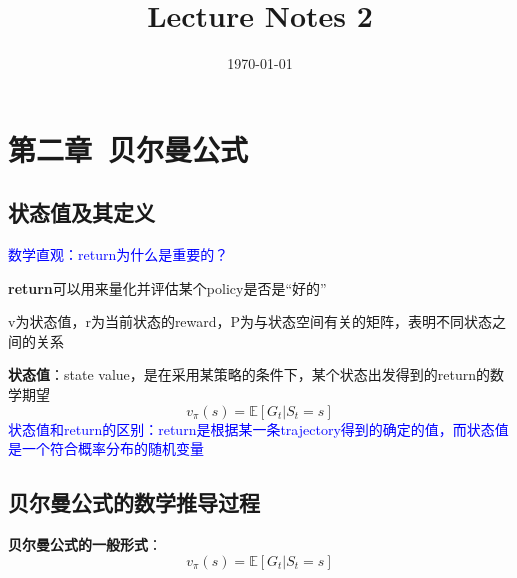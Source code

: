 \documentclass{article}
\begin{document}
\title{Lecture Notes 2}
\author{}
\date{\today}
\maketitle
\section{第二章\ 贝尔曼公式}
\subsection{状态值及其定义}
\textcolor{blue}{\kaishu*数学直观：return为什么是重要的？}

\textbf{return}可以用来量化并评估某个policy是否是“好的”

v为状态值，r为当前状态的reward，P为与状态空间有关的矩阵，表明不同状态之间的关系

\textbf{状态值}：state value，是在采用某策略的条件下，某个状态出发得到的return的数学期望
\[
v_{\pi}(s) = \mathbb{E}[G_t | S_t = s]
\]
\textcolor{blue}{\kaishu*状态值和return的区别：return是根据某一条trajectory得到的确定的值，而状态值是一个符合概率分布的随机变量}
\subsection{贝尔曼公式的数学推导过程}
\textbf{贝尔曼公式的一般形式}：
$$v_{\pi}(s) = \mathbb{E}[G_t | S_t = s]$$
\end{document}
